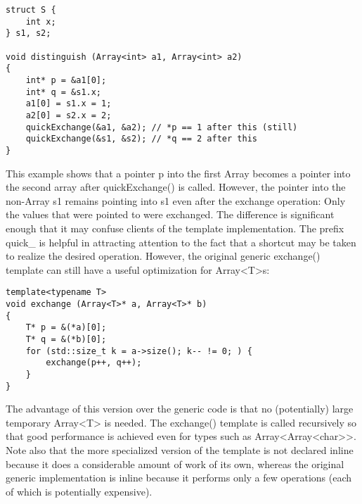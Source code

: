 \begin{lstlisting}[style=styleCXX]
struct S {
	int x;
} s1, s2;

void distinguish (Array<int> a1, Array<int> a2)
{
	int* p = &a1[0];
	int* q = &s1.x;
	a1[0] = s1.x = 1;
	a2[0] = s2.x = 2;
	quickExchange(&a1, &a2); // *p == 1 after this (still)
	quickExchange(&s1, &s2); // *q == 2 after this
}
\end{lstlisting}


This example shows that a pointer p into the first Array becomes a pointer into the second array after quickExchange() is called. However, the pointer into the non-Array s1 remains pointing into s1 even after the exchange operation: Only the values that were pointed to were exchanged. The difference is significant enough that it may confuse clients of the template implementation. The prefix quick\_ is helpful in attracting attention to the fact that a shortcut may be taken to realize the desired operation. However, the original generic exchange() template can still have a useful optimization for Array<T>s:

\begin{lstlisting}[style=styleCXX]
template<typename T>
void exchange (Array<T>* a, Array<T>* b)
{
	T* p = &(*a)[0];
	T* q = &(*b)[0];
	for (std::size_t k = a->size(); k-- != 0; ) {
		exchange(p++, q++);
	}
}
\end{lstlisting}

The advantage of this version over the generic code is that no (potentially) large temporary Array<T> is needed. The exchange() template is called recursively so that good performance is achieved even for types such as Array<Array<char>>. Note also that the more specialized version of the template is not declared inline because it does a considerable amount of work of its own, whereas the original generic implementation is inline because it performs only a few operations (each of which is potentially expensive).









